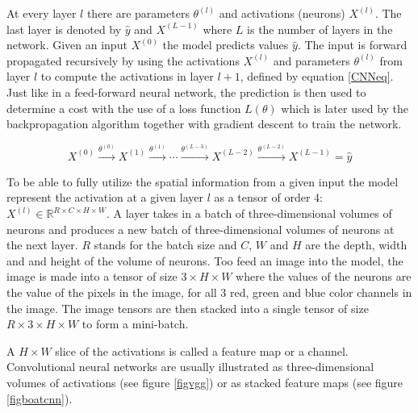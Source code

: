 \documentclass[a4paper,11pt,twoside]{article}
\begin{document}
At every layer $l$ there are parameters $\theta^{(l)}$ and activations (neurons) $X^{(l)}$. The last layer is denoted by $\hat{y}$ and $X^{(L-1)}$ where $L$ is the number of layers in the network. Given an input $X^{(0)}$ the model predicts values $\hat{y}$. The input is forward propagated recursively by using the activations $X^{(l)}$ and parameters $\theta^{(l)}$ from layer $l$ to compute the activations in layer $l+1$, defined by equation \eqref{CNNeq}. Just like in a feed-forward neural network, the prediction is then used to determine a cost with the use of a loss function $L(\theta)$ which is later used by the backpropagation algorithm together with gradient descent to train the network. \cite{cs231n} \cite{convmath}

\begin{equation}\label{CNNeq}
X^{(0)} \xrightarrow{\theta^{(0)}} X^{(1)}  \xrightarrow{\theta^{(1)}} \cdots  \xrightarrow{\theta^{(L-3)}} X^{(L-2)}  \xrightarrow{\theta^{(L-2)}} X^{(L-1)} = \hat{y}
\end{equation}

To be able to fully utilize the spatial information from a given input the model represent the activation at a given layer $l$ as a tensor of order 4: $X^{(l)} \in \mathbb{R}^{R \times C  \times H \times W}$. A layer takes in a batch of three-dimensional volumes of neurons and produces a new batch of three-dimensional volumes of neurons at the next layer. $R$ stands for the batch size and $C$, $W$ and $H$ are the depth, width and and height of the volume of neurons. Too feed an image into the model, the image is made into a tensor of size $3 \times H \times W$ where the values of the neurons are the value of the pixels in the image, for all 3 red, green and blue color channels in the image. The image tensors are then stacked into a single tensor of size $R \times 3 \times H \times W$ to form a mini-batch. \cite{cs231n} 

A $H \times W$ slice of the activations is called a feature map or a channel. Convolutional neural networks are usually illustrated as three-dimensional volumes of activations (see figure \ref{figvgg}) or as stacked feature maps (see figure \ref{figboatcnn}). \cite{cs231n} \cite{convmath} \cite{convarithmetic}
\end{document}
